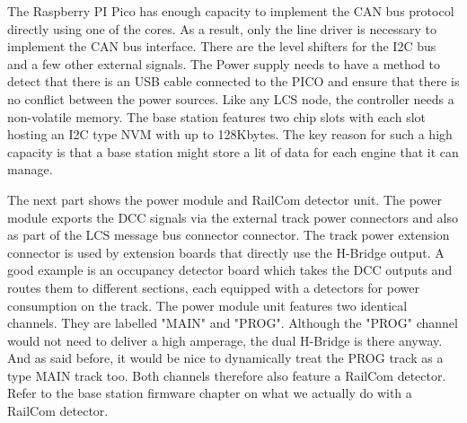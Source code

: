 
The Raspberry PI Pico has enough capacity to implement the CAN bus protocol directly using one of the cores. As a result, only the line driver is necessary to implement the CAN bus interface. There are the level shifters for the I2C bus and a few other external signals. The Power supply needs to have a method to detect that there is an USB cable connected to the PICO and ensure that there is no conflict between the power sources. Like any LCS node, the controller needs a non-volatile memory. The base station features two chip slots with each slot hosting an I2C type NVM with up to 128Kbytes. The key reason for such a high capacity is that a base station might store a lit of data for each engine that it can manage.


The next part shows the power module and RailCom detector unit. The power module exports the DCC signals via the external track power connectors and also as part of the LCS message bus connector connector. The track power extension connector is used by extension boards that directly use the H-Bridge output. A good example is an occupancy detector board which takes the DCC outputs and routes them to different sections, each equipped with a detectors for power consumption on the track. The power module unit features two identical channels. They are labelled "MAIN" and "PROG". Although the "PROG" channel would not need to deliver a high amperage, the dual H-Bridge is there anyway. And as said before, it would be nice to dynamically treat the PROG track as a type MAIN track too. Both channels therefore also feature a RailCom detector. Refer to the base station firmware chapter on what we actually do with a RailCom detector.


